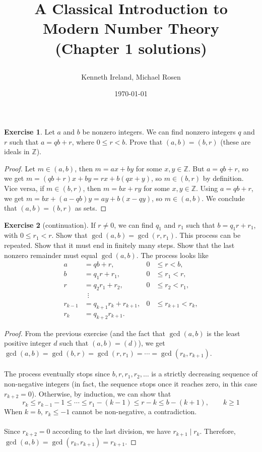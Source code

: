 \documentclass{article}
\title{
	\textbf{A Classical Introduction to Modern Number Theory \\ (Chapter 1 solutions)}
	\author{Kenneth Ireland, Michael Rosen}
}
\date{\today}
\theoremstyle{definition}
\newtheorem{exercise}{Exercise}
\begin{document}
\maketitle

\newpage

\begin{exercise} \label{c1-ex-1}
Let $a$ and $b$ be nonzero integers. We can find nonzero integers $q$ and $r$ such that $a = qb + r$, where $0 \leq r < b$. Prove that $(a, b) = (b, r)$ (these are ideals in $\mathbb{Z}$).
\end{exercise}
\begin{proof}
Let $m \in (a, b)$, then $m = ax + by$ for some $x, y \in \mathbb{Z}$. But $a = qb + r$, so we get $m = (qb + r) x + by = r x + b (qx + y)$, so $m \in (b, r)$ by definition. Vice versa, if $m \in (b, r)$, then $m = bx + ry$ for some $x, y \in \mathbb{Z}$. Using $a = qb + r$, we get $m = bx + (a - qb) y = ay + b(x - qy)$, so $m \in (a, b)$. We conclude that $(a, b) = (b, r)$ as sets.
\end{proof}

\newpage

\begin{exercise}[continuation] \label{c1-ex-2}
If $r \neq 0$, we can find $q_1$ and $r_1$ such that $b = q_1 r + r_1$, with $0 \leq r_1 < r$. Show that $\gcd(a, b) = \gcd(r, r_1)$. This process can be repeated. Show that it must end in finitely many steps. Show that the last nonzero remainder must equal $\gcd(a, b)$. The process looks like
\begin{align*}
a & = qb + r, & 0 & \leq r < b, \\
b & = q_1 r + r_1, & 0 & \leq r_1 < r, \\
r & = q_2 r_1 + r_2, & 0 & \leq r_2 < r_1, \\
& \enspace\vdots & & \\
r_{k - 1} & = q_{k + 1} r_k + r_{k + 1}, & 0 & \leq r_{k + 1} < r_k, \\
r_k & = q_{k + 2} r_{k + 1}. & & 
\end{align*}
\end{exercise}
\begin{proof}
From the previous exercise (and the fact that $\gcd(a, b)$ is the least positive integer $d$ such that $(a, b) = (d)$), we get $\gcd(a, b) = \gcd(b, r) = \gcd(r, r_1) = \cdots = \gcd(r_k, r_{k + 1})$.
\\
\\
The process eventually stops since $b, r, r_1, r_2, \hdots$ is a strictly decreasing sequence of non-negative integers (in fact, the sequence stops once it reaches zero, in this case $r_{k + 2} = 0$).  Otherwise, by induction, we can show that
$$r_k \leq r_{k - 1} - 1 \leq \cdots \leq r_1 - (k - 1) \leq r - k \leq b - (k + 1), \qquad k \geq 1$$
When $k = b$, $r_k \leq -1$ cannot be non-negative, a contradiction.
\\
\\
Since $r_{k + 2} = 0$ according to the last division, we have $r_{k + 1} \mid r_k$. Therefore, $\gcd(a, b) = \gcd(r_k, r_{k + 1}) = r_{k + 1}$.
\end{proof}
\end{document}
